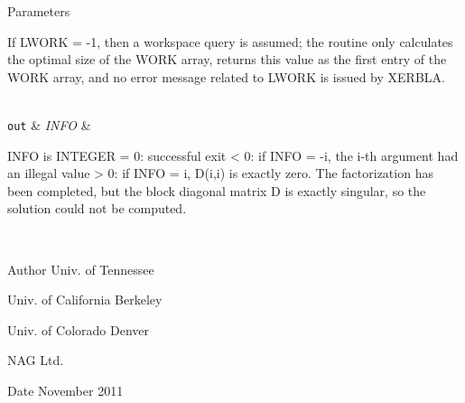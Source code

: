 \begin{DoxyParams}[1]{Parameters}
\begin{DoxyVerb}
          If LWORK = -1, then a workspace query is assumed; the routine
          only calculates the optimal size of the WORK array, returns
          this value as the first entry of the WORK array, and no error
          message related to LWORK is issued by XERBLA.\end{DoxyVerb}
\\
\hline
\mbox{\tt out}  & {\em I\+N\+F\+O} & \begin{DoxyVerb}          INFO is INTEGER
          = 0: successful exit
          < 0: if INFO = -i, the i-th argument had an illegal value
          > 0: if INFO = i, D(i,i) is exactly zero.  The factorization
               has been completed, but the block diagonal matrix D is
               exactly singular, so the solution could not be computed.\end{DoxyVerb}
 \\
\hline
\end{DoxyParams}
\begin{DoxyAuthor}{Author}
Univ. of Tennessee 

Univ. of California Berkeley 

Univ. of Colorado Denver 

N\+A\+G Ltd. 
\end{DoxyAuthor}
\begin{DoxyDate}{Date}
November 2011 
\end{DoxyDate}
